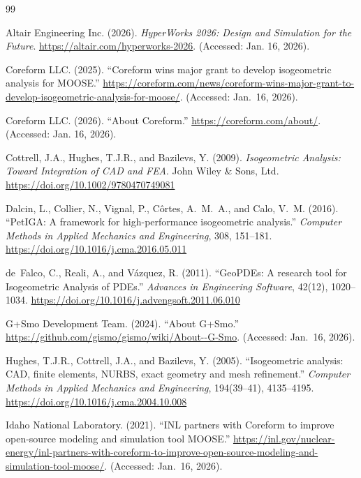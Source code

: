 \documentclass[12pt,report,justified]{SANDreport}
\begin{document}
\begin{thebibliography}{99} %

Altair Engineering Inc. (2026). \emph{HyperWorks 2026: Design and Simulation for the Future}. \url{https://altair.com/hyperworks-2026}. (Accessed: Jan. 16, 2026).

{Coreform LLC}. (2025).
``Coreform wins major grant to develop isogeometric analysis for {MOOSE}.''
\url{https://coreform.com/news/coreform-wins-major-grant-to-develop-isogeometric-analysis-for-moose/}.
(Accessed: Jan.\ 16, 2026).

Coreform LLC. (2026). ``About Coreform.'' \url{https://coreform.com/about/}. (Accessed: Jan. 16, 2026).

Cottrell, J.A., Hughes, T.J.R., and Bazilevs, Y. (2009). \emph{Isogeometric Analysis: Toward Integration of CAD and FEA}. John Wiley \& Sons, Ltd. \url{https://doi.org/10.1002/9780470749081}

Dalcin, L., Collier, N., Vignal, P., C{\^o}rtes, A.~M.~A., and Calo, V.~M. (2016).
``{PetIGA}: {A} framework for high-performance isogeometric analysis.''
\emph{Computer Methods in Applied Mechanics and Engineering}, 308, 151--181.
\url{https://doi.org/10.1016/j.cma.2016.05.011}

de~Falco, C., Reali, A., and V{\'a}zquez, R. (2011).
``{GeoPDEs}: A research tool for {I}sogeometric {A}nalysis of {PDEs}.''
\emph{Advances in Engineering Software}, 42(12), 1020--1034.
\url{https://doi.org/10.1016/j.advengsoft.2011.06.010}

{G+Smo Development Team}. (2024).
``About {G+Smo}.''
\url{https://github.com/gismo/gismo/wiki/About--G-Smo}.
(Accessed: Jan.\ 16, 2026).

Hughes, T.J.R., Cottrell, J.A., and Bazilevs, Y. (2005).
``Isogeometric analysis: {CAD}, finite elements, {NURBS}, exact geometry and mesh refinement.''
\emph{Computer Methods in Applied Mechanics and Engineering}, 194(39--41), 4135--4195.
\url{https://doi.org/10.1016/j.cma.2004.10.008}

{Idaho National Laboratory}. (2021).
``{INL} partners with {C}oreform to improve open-source modeling and simulation tool {MOOSE}.''
\url{https://inl.gov/nuclear-energy/inl-partners-with-coreform-to-improve-open-source-modeling-and-simulation-tool-moose/}.
(Accessed: Jan.\ 16, 2026).


\end{thebibliography}
\end{document}
